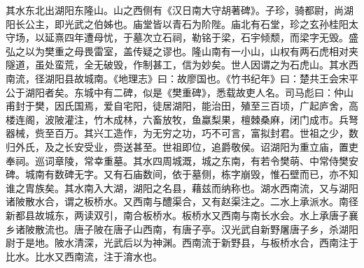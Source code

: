 \documentclass[12pt,UTF8]{ctexbook}
\begin{document}
其水东北出湖阳东隆山。山之西侧有《汉日南大守胡著碑》。子珍，骑都尉，尚湖阳长公主，即光武之伯姊也。庙堂皆以青石为阶陛。庙北有石堂，珍之玄孙桂阳太守场，以延熹四年遭母忧，于墓次立石祠，勒铭于梁，石宇倾颓，而梁字无毁。盛弘之以为樊重之母畏雷室，盖传疑之谬也。隆山南有一小山，山权有两石虎相对夹隧道，虽处蛮荒，全无破毁，作制甚工，信为妙矣。世人因谓之为石虎山。其水西南流，径湖阳县故城南。《地理志》曰：故廖国也。《竹书纪年》曰：楚共王会宋平公于湖阳者矣。东城中有二碑，似是《樊重碑》，悉载故吏人名。司马彪曰：仲山甫封于樊，因氏国焉，爱自宅阳，徒居湖阳，能治田，殖至三百顷，广起庐舍，高楼连阁，波陂灌注，竹木成林，六畜放牧，鱼蠃梨果，檀棘桑麻，闭门成市。兵弩器械，赀至百万。其兴工造作，为无穷之功，巧不可言，富拟封君。世祖之少，数归外氏，及之长安受业，赍送甚至。世祖即位，追爵敬侯。诏湖阳为重立庙，置吏奉祠。巡词章陵，常幸重墓。其水四周城溉，城之东南，有若令樊萌、中常侍樊安碑。城南有数碑无字。又有石庙数间，依于墓侧，栋字崩毁，惟石壁而已，亦不知谁之胄族矣。其水南入大湖，湖阳之名县，藉兹而纳称也。湖水西南流，又与湖阳诸陂散水合，谓之板桥水。又西南与醴渠合，又有赵渠注之。二水上承派水。南径新都县故城东，两读双引，南合板桥水。板桥水又西南与南长水会。水上承唐子襄乡诸陂散流也。唐子陂在唐子山西南，有唐子亭。汉光武自新野屠唐子乡，杀湖阳尉于是地。陂水清深，光武后以为神渊。西南流于新野县，与板桥水合，西南注于比水。比水又西南流，注于淯水也。
\end{document}
